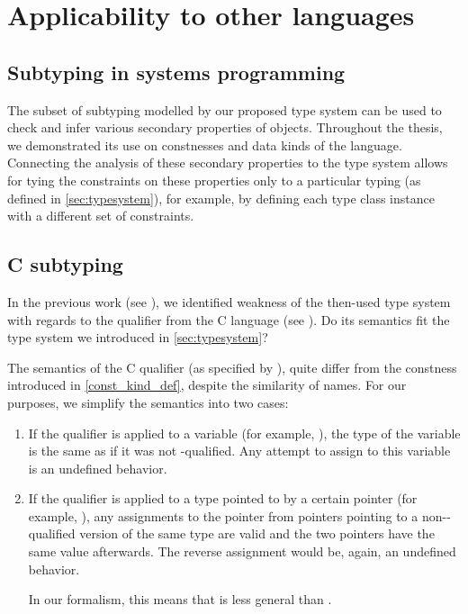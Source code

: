 \section{Applicability to other languages}



\subsection{Subtyping in systems programming}

The subset of subtyping modelled by our proposed type system can be used to check and infer various secondary properties of objects. Throughout the thesis, we demonstrated its use on constnesses and data kinds of the \cmm{} language. Connecting the analysis of these secondary properties to the type system allows for tying the constraints on these properties only to a particular typing (as defined in \cref{sec:typesystem}), for example, by defining each type class instance with a different set of constraints.

\subsection{C subtyping}

In the previous work (see \cite{klepl2020type}), we identified weakness of the then-used type system with regards to the  qualifier from the C language (see \cite{cstandard2018}). Do its semantics fit the type system we introduced in \cref{sec:typesystem}?

The semantics of the C  qualifier (as specified by \cite{cstandard2018}), quite differ from the constness introduced in \cref{const_kind_def}, despite the similarity of names. For our purposes, we simplify the semantics into two cases:

\begin{enumerate}
    \item If the  qualifier is applied to a variable (for example, ), the type of the variable is the same as if it was not -qualified. Any attempt to assign to this variable is an undefined behavior. \label{constvar}

    \item If the  qualifier is applied to a type pointed to by a certain pointer (for example, ), any assignments to the pointer from pointers pointing to a non--qualified version of the same type are valid and the two pointers have the same value afterwards. The reverse assignment would be, again, an undefined behavior. \label{pointerSubtype}

    In our formalism, this means that  is less general than .
\end{enumerate}

